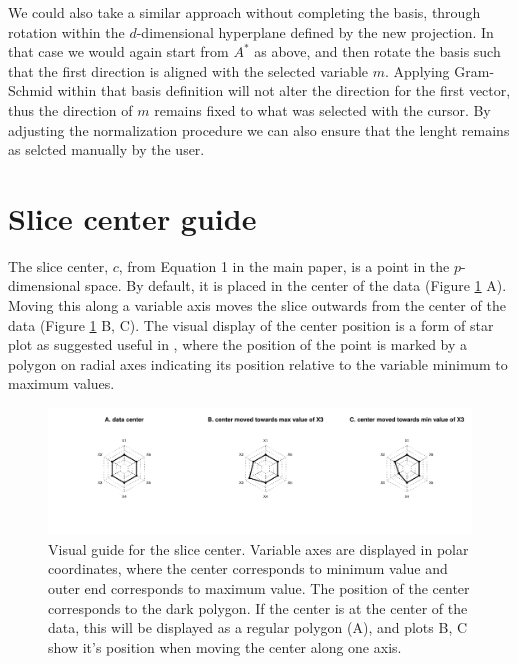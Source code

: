\documentclass[]{interact}
\theoremstyle{plain}%
\theoremstyle{definition}
\theoremstyle{remark}
\begin{document}
We could also take a similar approach without completing the basis,
through rotation within the \(d\)-dimensional hyperplane defined by the
new projection. In that case we would again start from \(A^*\) as above,
and then rotate the basis such that the first direction is aligned with
the selected variable \(m\). Applying Gram-Schmid within that basis
definition will not alter the direction for the first vector, thus the
direction of \(m\) remains fixed to what was selected with the cursor.
By adjusting the normalization procedure we can also ensure that the
lenght remains as selcted manually by the user.

\hypertarget{slice-center-guide}{%
\section{Slice center guide}\label{slice-center-guide}}

The slice center, \(c\), from Equation 1 in the main paper, is a point
in the \(p\)-dimensional space. By default, it is placed in the center
of the data (Figure \ref{fig:anchornav} A). Moving this along a variable
axis moves the slice outwards from the center of the data (Figure
\ref{fig:anchornav} B, C). The visual display of the center position is
a form of star plot as suggested useful in \citet{condviz2}, where the
position of the point is marked by a polygon on radial axes indicating
its position relative to the variable minimum to maximum values.

\begin{figure}
\includegraphics[width=1\linewidth]{arxiv_files/figure-latex/anchornav-1} \caption{Visual guide for the slice center. Variable axes are displayed in polar coordinates, where the center corresponds to minimum value and outer end corresponds to maximum value. The position of the center corresponds to the dark polygon. If the center is at the center of the data, this will be displayed as a regular polygon (A), and plots B, C show it's position when moving the center along one axis.}\label{fig:anchornav}
\end{figure}
\end{document}
